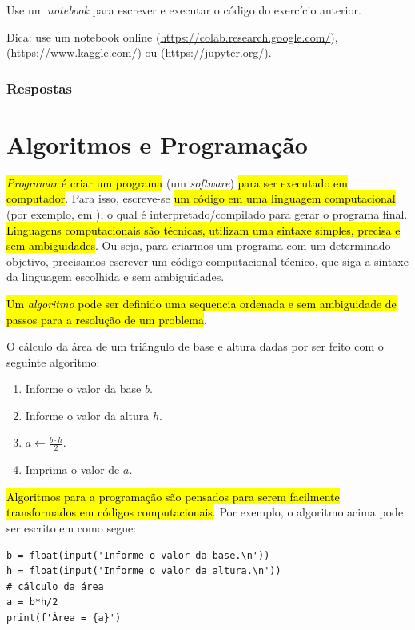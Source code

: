 \begin{exer}
  Use um \textit{notebook} {\python} para escrever e executar o código do exercício anterior.
\end{exer}
\begin{resp}
  Dica: use um notebook online {\colab} (\url{https://colab.research.google.com/}), {\kaggle} (\url{https://www.kaggle.com/}) ou {\jupyter} (\url{https://jupyter.org/}).
\end{resp}

\ifisbook
\subsubsection{Respostas}
\shipoutAnswer
\fi

\section{Algoritmos e Programação}\label{cap_lingua_sec_algoprog}

\hl{\emph{Programar} é criar um programa} (um \textit{software}) \hl{para ser executado em computador}. Para isso, escreve-se \hl{um código em uma linguagem computacional} (por exemplo, em {\python}), o qual é interpretado/compilado para gerar o programa final. \hl{Linguagens computacionais são técnicas, utilizam uma sintaxe simples, precisa e sem ambiguidades}. Ou seja, para criarmos um programa com um determinado objetivo, precisamos escrever um código computacional técnico, que siga a sintaxe da linguagem escolhida e sem ambiguidades.

\hl{Um \emph{algoritmo} pode ser definido uma sequencia ordenada e sem ambiguidade de passos para a resolução de um problema}.

\begin{ex}\label{cap_lingua_sec_algoprog:ex:areaTriang}
O cálculo da área de um triângulo de base e altura dadas por ser feito com o seguinte algoritmo:
\begin{enumerate}
\item Informe o valor da base $b$.
\item Informe o valor da altura $h$.
\item $\displaystyle a \leftarrow \frac{b\cdot h}{2}$.
\item Imprima o valor de $a$.
\end{enumerate}

\hl{Algoritmos para a programação são pensados para serem facilmente transformados em códigos computacionais}. Por exemplo, o algoritmo acima pode ser escrito em {\python} como segue:

\begin{lstlisting}
b = float(input('Informe o valor da base.\n'))
h = float(input('Informe o valor da altura.\n'))
# cálculo da área
a = b*h/2
print(f'Área = {a}')
\end{lstlisting}

\end{ex}

